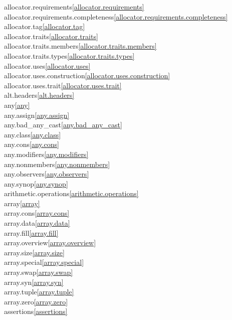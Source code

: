 \begin{multicols}{2}
allocator.requirements\quad\ref{allocator.requirements}\\
allocator.requirements.completeness\quad\ref{allocator.requirements.completeness}\\
allocator.tag\quad\ref{allocator.tag}\\
allocator.traits\quad\ref{allocator.traits}\\
allocator.traits.members\quad\ref{allocator.traits.members}\\
allocator.traits.types\quad\ref{allocator.traits.types}\\
allocator.uses\quad\ref{allocator.uses}\\
allocator.uses.construction\quad\ref{allocator.uses.construction}\\
allocator.uses.trait\quad\ref{allocator.uses.trait}\\
alt.headers\quad\ref{alt.headers}\\
any\quad\ref{any}\\
any.assign\quad\ref{any.assign}\\
any.bad_any_cast\quad\ref{any.bad_any_cast}\\
any.class\quad\ref{any.class}\\
any.cons\quad\ref{any.cons}\\
any.modifiers\quad\ref{any.modifiers}\\
any.nonmembers\quad\ref{any.nonmembers}\\
any.observers\quad\ref{any.observers}\\
any.synop\quad\ref{any.synop}\\
arithmetic.operations\quad\ref{arithmetic.operations}\\
array\quad\ref{array}\\
array.cons\quad\ref{array.cons}\\
array.data\quad\ref{array.data}\\
array.fill\quad\ref{array.fill}\\
array.overview\quad\ref{array.overview}\\
array.size\quad\ref{array.size}\\
array.special\quad\ref{array.special}\\
array.swap\quad\ref{array.swap}\\
array.syn\quad\ref{array.syn}\\
array.tuple\quad\ref{array.tuple}\\
array.zero\quad\ref{array.zero}\\
assertions\quad\ref{assertions}\\

\end{multicols}
